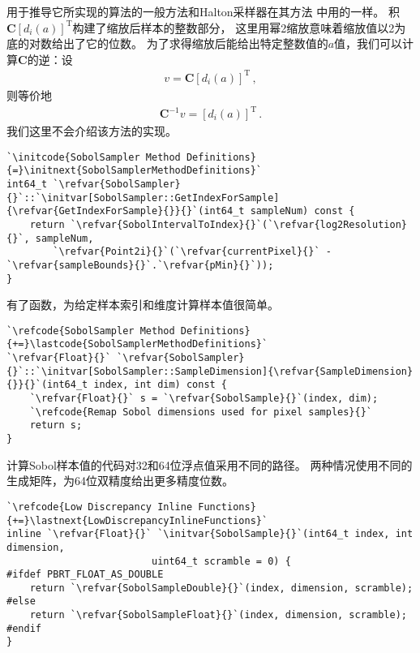 用于推导它所实现的算法的一般方法和Halton采样器在其方法\linebreak
{}中用的一样。
积${\bm C}[d_i(a)]^{\mathrm{T}}$构建了缩放后样本的整数部分，
这里用幂2缩放意味着缩放值以2为底的对数给出了它的位数。
为了求得缩放后能给出特定整数值的$a$值，我们可以计算$\bm C$的逆：设
\begin{align*}
    v={\bm C}[d_i(a)]^{\mathrm{T}}\, ,
\end{align*}
则等价地
\begin{align*}
    {\bm C}^{-1}v=[d_i(a)]^{\mathrm{T}}\, .
\end{align*}
我们这里不会介绍该方法的实现。
\begin{lstlisting}
`\initcode{SobolSampler Method Definitions}{=}\initnext{SobolSamplerMethodDefinitions}`
int64_t `\refvar{SobolSampler}{}`::`\initvar[SobolSampler::GetIndexForSample]{\refvar{GetIndexForSample}{}}{}`(int64_t sampleNum) const {
    return `\refvar{SobolIntervalToIndex}{}`(`\refvar{log2Resolution}{}`, sampleNum,
        `\refvar{Point2i}{}`(`\refvar{currentPixel}{}` - `\refvar{sampleBounds}{}`.`\refvar{pMin}{}`));
}
\end{lstlisting}

有了函数，为给定样本索引和维度计算样本值很简单。
\begin{lstlisting}
`\refcode{SobolSampler Method Definitions}{+=}\lastcode{SobolSamplerMethodDefinitions}`
`\refvar{Float}{}` `\refvar{SobolSampler}{}`::`\initvar[SobolSampler::SampleDimension]{\refvar{SampleDimension}{}}{}`(int64_t index, int dim) const {
    `\refvar{Float}{}` s = `\refvar{SobolSample}{}`(index, dim);
    `\refcode{Remap Sobol dimensions used for pixel samples}{}`
    return s;
}
\end{lstlisting}

计算Sobol样本值的代码对32和64位浮点值采用不同的路径。
两种情况使用不同的生成矩阵，为64位双精度给出更多精度位数。
\begin{lstlisting}
`\refcode{Low Discrepancy Inline Functions}{+=}\lastnext{LowDiscrepancyInlineFunctions}`
inline `\refvar{Float}{}` `\initvar{SobolSample}{}`(int64_t index, int dimension,
                         uint64_t scramble = 0) {
#ifdef PBRT_FLOAT_AS_DOUBLE
    return `\refvar{SobolSampleDouble}{}`(index, dimension, scramble);
#else
    return `\refvar{SobolSampleFloat}{}`(index, dimension, scramble);
#endif
}
\end{lstlisting}

